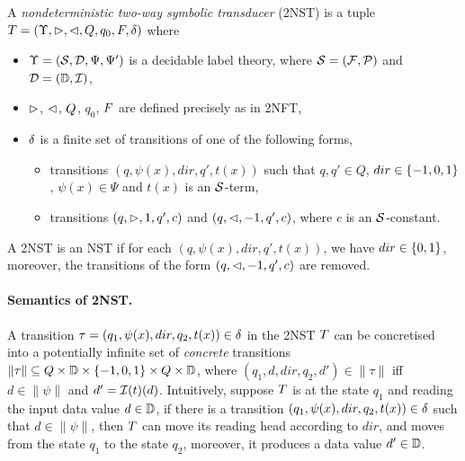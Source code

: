 \begin{definition}
    A \emph{nondeterministic two-way  symbolic \emph{transducer}} (2NST) is a tuple $T = (\Upsilon, \vartriangleright, \vartriangleleft, Q, q_0, F, \delta)$ where  
\begin{itemize}
\item $\Upsilon=(\mathcal{S}, \mathcal{D}, \Psi, \Psi')$ is a decidable label theory, where $\mathcal{S} = ({\mathcal{F}}, {\mathcal{P}})$ and $\mathcal{D} = (\mathbb{D}, \mathcal{I})$,
%
\item $\vartriangleright$, $\vartriangleleft$, $Q$, $q_0$, $F$ are defined precisely as in 2NFT, 
%
\item $\delta$ is a finite set of  transitions of one of the following forms,
\begin{itemize}
\item   transitions $(q, \psi(x), dir, q', t(x))$ such that $q, q' \in Q$, $dir \in \{-1, 0, 1\}$, $\psi(x) \in \Psi$ and
$t(x)$ is an $\mathcal{S}$-term, 
\item   transitions $(q, \vartriangleright, 1, q', c)$ and $(q, \vartriangleleft, -1, q', c)$, where $c$ is an $\mathcal{S}$-constant. 
\end{itemize}
\end{itemize}
A 2NST is an NST if for each $(q, \psi(x), dir, q', t(x))$, we have $dir \in \{0, 1\}$, moreover, the transitions of the form $(q, \vartriangleleft, -1, q', c)$ are removed.
\end{definition}

\paragraph{Semantics of 2NST.}
A transition $\tau=(q_1,\psi(x), dir, q_2, t(x)) \in \delta$ in the 2NST $T$ can be concretised
into a potentially infinite set of \emph{concrete} transitions $\|\tau\| \subseteq Q \times \mathbb{D} \times \{-1, 0, 1\} \times Q \times \mathbb{D}$, where $(q_1, d, dir, q_2, d')  \in \|\tau\|$ iff $d \in \|\psi\|$ and $d' = \mathcal{I}(t)(d)$.
Intuitively, suppose $T$ is at the state $q_1$ and reading the input data value $d \in \mathbb{D}$,
if there is a transition $(q_1, \psi(x), dir, q_2, t(x) )\in \delta$ such that $d \in \|\psi\|$, then $T$ can move its reading head according to $dir$, and moves from the state
$q_1$ to the state $q_2$, moreover, it produces a data value $d' \in \mathbb{D}$.

